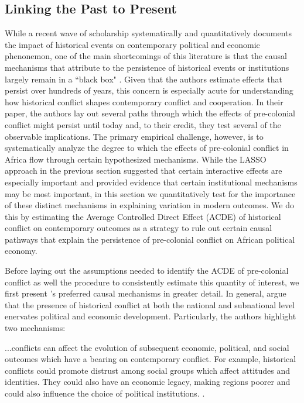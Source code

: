 \subsection{Linking the Past to Present}

While a recent wave of scholarship systematically and quantitatively documents the impact of historical events on contemporary political and economic phenonemon, one of the main shortcomings of this literature is that the causal mechanisms that attribute to the persistence of historical events or institutions largely remain in a ``black box" \citep{ImaiEtAl2011,AcharyaBlackwellSen2016}. Given that the authors estimate effects that persist over hundreds of years, this concern is especially acute for understanding how historical conflict shapes contemporary conflict and cooperation. In their paper, the authors lay out several paths through which the effects of pre-colonial conflict might persist until today and, to their credit, they test several of the observable implications. The primary empirical challenge, however, is to systematically analyze the degree to which the effects of pre-colonial conflict in Africa flow through certain hypothesized mechanisms. While the LASSO approach in the previous section suggested that certain interactive effects are especially important and provided evidence that certain institutional mechanisms may be most important, in this section we quantitatively test for the importance of these distinct mechanisms in explaining variation in modern outcomes. We do this by estimating the Average Controlled Direct Effect (ACDE) of historical conflict on contemporary outcomes as a strategy to rule out certain causal pathways that explain the persistence of pre-colonial conflict on African political economy.

Before laying out the assumptions needed to identify the ACDE of pre-colonial conflict as well the procedure to consistently estimate this quantity of interest, we first present \citet{BesleyRQ2014}'s preferred causal mechanisms in greater detail. In general, \citet{BesleyRQ2014} argue that the presence of historical conflict at both the national and subnational level enervates political and economic development. Particularly, the authors highlight two mechanisms:

\begin{displayquote}
...conflicts can affect the evolution of subsequent economic, political, and social outcomes which have a bearing on contemporary conflict. For example, historical conflicts could promote distrust among social groups which affect attitudes and identities. They could also have an economic legacy, making regions poorer and could also influence the choice of political institutions. \citep[pg. 321]{BesleyRQ2014}.
\end{displayquote} 

